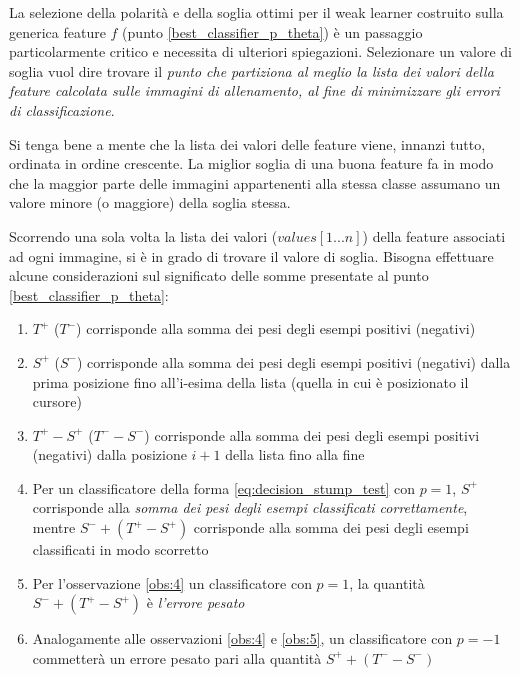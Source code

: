             La selezione della polarità e della soglia ottimi per il weak learner costruito sulla generica feature $f$ (punto \ref{best_classifier_p_theta}) è un passaggio particolarmente critico e necessita di ulteriori spiegazioni.
            Selezionare un valore di soglia vuol dire trovare il \emph{punto che partiziona al meglio la lista dei valori della feature calcolata sulle immagini di allenamento, al fine di minimizzare gli errori di classificazione}.
            
            Si tenga bene a mente che la lista dei valori delle feature viene, innanzi tutto, ordinata in ordine crescente.
            La miglior soglia di una buona feature fa in modo che la maggior parte delle immagini appartenenti alla stessa classe assumano un valore minore (o maggiore) della soglia stessa.

            Scorrendo una sola volta la lista dei valori ($values[1...n]$) della feature associati ad ogni immagine, si è in grado di trovare il valore di soglia.
            Bisogna effettuare alcune considerazioni sul significato delle somme presentate al punto \ref{best_classifier_p_theta}:
            \begin{enumerate}
                \item \label{obs:1} $T^+$ ($T^-$) corrisponde alla somma dei pesi degli esempi positivi (negativi)
                \item \label{obs:2} $S^+$ ($S^-$) corrisponde alla somma dei pesi degli esempi positivi (negativi) dalla prima posizione fino all'i-esima della lista (quella in cui è posizionato il cursore)
                \item \label{obs:3} $T^+ - S^+$ ($T^- - S^-$) corrisponde alla somma dei pesi degli esempi positivi (negativi) dalla posizione $i+1$ della lista fino alla fine
                \item \label{obs:4} Per un classificatore della forma \ref{eq:decision_stump_test} con $p = 1$, $S^+$ corrisponde alla \emph{somma dei pesi degli esempi classificati correttamente}, mentre $S^- + (T^+ - S^+)$ corrisponde alla somma dei pesi degli esempi classificati in modo scorretto
                \item \label{obs:5} Per l'osservazione \ref{obs:4} un classificatore con $p = 1$, la quantità $S^- + (T^+ - S^+)$ è \emph{l'errore pesato}
                \item \label{obs:6} Analogamente alle osservazioni \ref{obs:4} e \ref{obs:5}, un classificatore con $p = -1$ commetterà un errore pesato pari alla quantità $S^+ + (T^- - S^-)$
            \end{enumerate}

